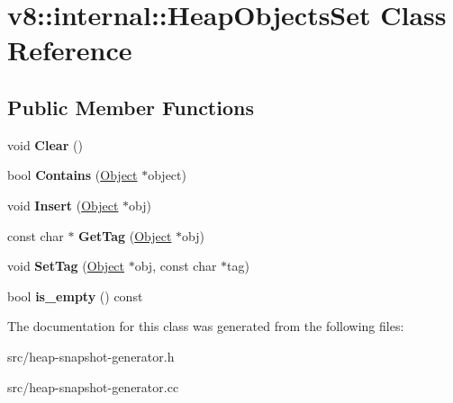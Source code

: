 \hypertarget{classv8_1_1internal_1_1_heap_objects_set}{}\section{v8\+:\+:internal\+:\+:Heap\+Objects\+Set Class Reference}
\label{classv8_1_1internal_1_1_heap_objects_set}
\subsection*{Public Member Functions}
\begin{DoxyCompactItemize}
\item 
\hypertarget{classv8_1_1internal_1_1_heap_objects_set_a6718f74f54fe69aa7f684838939d3fa8}{}void {\bfseries Clear} ()\label{classv8_1_1internal_1_1_heap_objects_set_a6718f74f54fe69aa7f684838939d3fa8}

\item 
\hypertarget{classv8_1_1internal_1_1_heap_objects_set_a03b79360ff3a229f2b4065a714fade8a}{}bool {\bfseries Contains} (\hyperlink{classv8_1_1internal_1_1_object}{Object} $\ast$object)\label{classv8_1_1internal_1_1_heap_objects_set_a03b79360ff3a229f2b4065a714fade8a}

\item 
\hypertarget{classv8_1_1internal_1_1_heap_objects_set_a51f62e781c408b48b9790f0a9b1bcb46}{}void {\bfseries Insert} (\hyperlink{classv8_1_1internal_1_1_object}{Object} $\ast$obj)\label{classv8_1_1internal_1_1_heap_objects_set_a51f62e781c408b48b9790f0a9b1bcb46}

\item 
\hypertarget{classv8_1_1internal_1_1_heap_objects_set_ab1b1310426df7a94540439298caf9887}{}const char $\ast$ {\bfseries Get\+Tag} (\hyperlink{classv8_1_1internal_1_1_object}{Object} $\ast$obj)\label{classv8_1_1internal_1_1_heap_objects_set_ab1b1310426df7a94540439298caf9887}

\item 
\hypertarget{classv8_1_1internal_1_1_heap_objects_set_a4d7936c9c8bcd19a50787a5c92fda851}{}void {\bfseries Set\+Tag} (\hyperlink{classv8_1_1internal_1_1_object}{Object} $\ast$obj, const char $\ast$tag)\label{classv8_1_1internal_1_1_heap_objects_set_a4d7936c9c8bcd19a50787a5c92fda851}

\item 
\hypertarget{classv8_1_1internal_1_1_heap_objects_set_a7e92066e51bef4f00b2de2d0d5fc5d4f}{}bool {\bfseries is\+\_\+empty} () const \label{classv8_1_1internal_1_1_heap_objects_set_a7e92066e51bef4f00b2de2d0d5fc5d4f}

\end{DoxyCompactItemize}


The documentation for this class was generated from the following files\+:\begin{DoxyCompactItemize}
\item 
src/heap-\/snapshot-\/generator.\+h\item 
src/heap-\/snapshot-\/generator.\+cc\end{DoxyCompactItemize}
